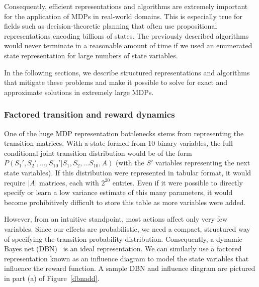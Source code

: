 Consequently, efficient representations and algorithms are extremely
important for the application of MDPs in real-world domains.
This is especially true for fields such as decision-theoretic
planning that often use propositional representations encoding billions
of states.  The previously described algorithms would never terminate
in a reasonable amount of time if we used an enumerated state 
representation for large numbers of state variables.

In the following sections, we describe structured representations and
algorithms that mitigate these problems and make it possible to solve
for exact and approximate solutions in extremely large MDPs.

\subsubsection{Factored transition and reward dynamics}

One of the huge MDP representation bottlenecks stems from
representing the transition matrices.  With a state formed
from 10 binary variables, the full conditional joint transition distribution would be
of the form \mbox{$P(S_1', S_2',\ldots, S_{10}' |  S_1, S_2, \ldots S_{10} , A)$} (with
the $S'$ variables representing the next state variables).  If
this distribution were represented in tabular format, it would require $|A|$
matrices, each with $2^{20}$ entries.  Even if it were possible to directly 
specify or learn a low variance estimate of this many parameters, it would
become prohibitively difficult to store this table as more variables
were added.

However, from an intuitive standpoint, most actions affect
only very few variables.   Since our effects
are probabilistic, we need a compact, structured way of specifying
the transition probability distribution.
Consequently, a dynamic Bayes net (DBN)~\cite{boutilier99dt} is an ideal representation.
We can similarly use a factored representation known as an influence diagram
to model the state variables that influence the reward function.
A sample DBN and influence diagram are pictured in part (a) of Figure~\ref{dbnadd}.

